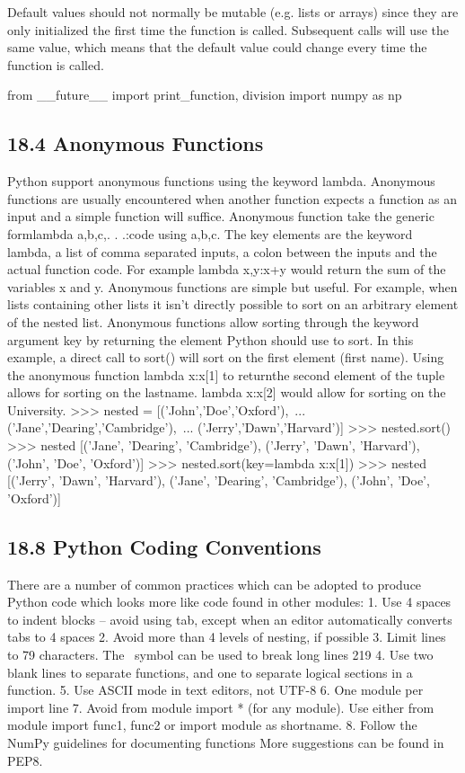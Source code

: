 Default values should not normally be mutable (e.g. lists or arrays) since they are only initialized the first
time the function is called. Subsequent calls will use the same value, which means that the default value
could change every time the function is called.

from __future__ import print_function, division
import numpy as np
\newpage
\subsection{18.4 Anonymous Functions}

Python support anonymous functions using the keyword lambda. Anonymous functions are usually encountered
when another function expects a function as an input and a simple function will suffice. Anonymous
function take the generic formlambda a,b,c,. . .:code using a,b,c. The key elements are the keyword
lambda, a list of comma separated inputs, a colon between the inputs and the actual function code. For
example lambda x,y:x+y would return the sum of the variables x and y.
Anonymous functions are simple but useful. For example, when lists containing other lists it isn’t
directly possible to sort on an arbitrary element of the nested list. Anonymous functions allow sorting
through the keyword argument key by returning the element Python should use to sort. In this example,
a direct call to sort() will sort on the first element (first name). Using the anonymous function
lambda x:x[1] to returnthe second element of the tuple allows for sorting on the lastname. lambda x:x[2]
would allow for sorting on the University.
>>> nested = [(’John’,’Doe’,’Oxford’),\
... (’Jane’,’Dearing’,’Cambridge’),\
... (’Jerry’,’Dawn’,’Harvard’)]
>>> nested.sort()
>>> nested
[(’Jane’, ’Dearing’, ’Cambridge’),
(’Jerry’, ’Dawn’, ’Harvard’),
(’John’, ’Doe’, ’Oxford’)]
>>> nested.sort(key=lambda x:x[1])
>>> nested
[(’Jerry’, ’Dawn’, ’Harvard’),
(’Jane’, ’Dearing’, ’Cambridge’),
(’John’, ’Doe’, ’Oxford’)]


\subsection{18.8 Python Coding Conventions}
There are a number of common practices which can be adopted to produce Python code which looks
more like code found in other modules:
1. Use 4 spaces to indent blocks – avoid using tab, except when an editor automatically converts tabs
to 4 spaces
2. Avoid more than 4 levels of nesting, if possible
3. Limit lines to 79 characters. The \ symbol can be used to break long lines
219
4. Use two blank lines to separate functions, and one to separate logical sections in a function.
5. Use ASCII mode in text editors, not UTF-8
6. One module per import line
7. Avoid from module import * (for any module). Use either from module import func1, func2 or
import module as shortname.
8. Follow the NumPy guidelines for documenting functions
More suggestions can be found in PEP8.
